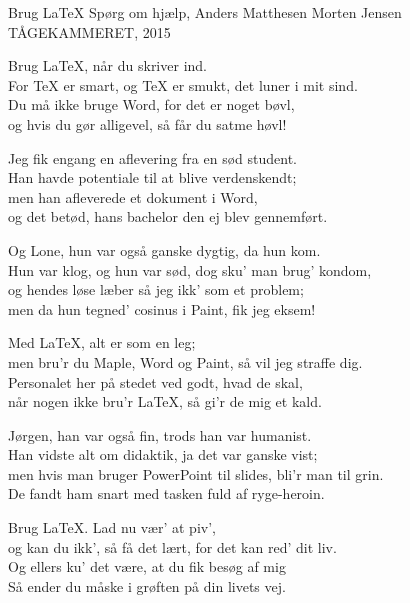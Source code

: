 \begin{song}{Brug \LaTeX}
  {} %
  {Spørg om hjælp, Anders Matthesen}
  {Morten Jensen}
  {TÅGEKAMMERET, 2015}
  {\NotCCLIed}

  \begin{SBChorus}
    Brug \LaTeX, når du skriver ind.\\
    For \TeX{} er smart, og \TeX{} er smukt, det luner i mit sind.\\
    Du må ikke bruge Word, for det er noget bøvl,\\
    og hvis du gør alligevel, så får du satme høvl!
  \end{SBChorus}

  \begin{SBVerse}
    Jeg fik engang en aflevering fra en sød student.\\
    Han havde potentiale til at blive verdenskendt;\\
    men han afleverede et dokument i Word,\\
    og det betød, hans bachelor den ej blev gennemført.
  \end{SBVerse}

  \begin{SBVerse}
    Og Lone, hun var også ganske dygtig, da hun kom.\\
    Hun var klog, og hun var sød, dog sku’ man brug’ kondom,\\
    og hendes løse læber så jeg ikk’ som et problem;\\
    men da hun tegned’ cosinus i Paint, fik jeg eksem!
  \end{SBVerse}

  \begin{SBChorus}
    Med \LaTeX, alt er som en leg;\\
    men bru’r du Maple, Word og Paint, så vil jeg straffe dig.\\
    Personalet her på stedet ved godt, hvad de skal,\\
    når nogen ikke bru’r \LaTeX, så gi’r de mig et kald.
  \end{SBChorus}

  \begin{SBVerse}
    Jørgen, han var også fin, trods han var humanist.\\
    Han vidste alt om didaktik, ja det var ganske vist;\\
    men hvis man bruger PowerPoint til slides, bli’r man til grin.\\
    De fandt ham snart med tasken fuld af ryge-heroin.
  \end{SBVerse}

  \begin{SBChorus}
    Brug \LaTeX. Lad nu vær’ at piv’,\\
    og kan du ikk’, så få det lært, for det kan red’ dit liv.\\
    Og ellers ku’ det være, at du fik besøg af mig\\
    Så ender du måske i grøften på din livets vej.
  \end{SBChorus}
\end{song}